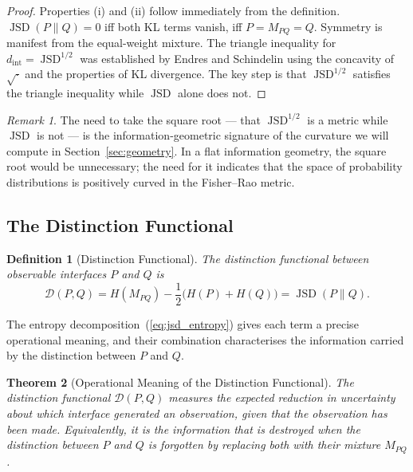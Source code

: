 \documentclass[12pt,a4paper]{article}
\newtheorem{theorem}{Theorem}[section]
\newtheorem{definition}[theorem]{Definition}
\theoremstyle{remark}
\newtheorem{remark}{Remark}[section]
\theoremstyle{definition}
\begin{document}
\begin{proof}
Properties (i) and (ii) follow immediately from the definition.
$\operatorname{JSD}(P\|Q) = 0$ iff both KL terms vanish, iff $P = M_{PQ} = Q$.
Symmetry is manifest from the equal-weight mixture. The triangle
inequality for $d_{\mathrm{int}} = \operatorname{JSD}^{1/2}$ was established
by Endres and Schindelin \cite{endres2003} using the concavity of
$\sqrt{\cdot}$ and the properties of KL divergence. The key step is that
$\operatorname{JSD}^{1/2}$ satisfies the triangle inequality while
$\operatorname{JSD}$ alone does not.
\end{proof}

\begin{remark}
The need to take the square root --- that $\operatorname{JSD}^{1/2}$ is
a metric while $\operatorname{JSD}$ is not --- is the information-geometric
signature of the curvature we will compute in Section~\ref{sec:geometry}.
In a flat information geometry, the square root would be unnecessary; the
need for it indicates that the space of probability distributions is
positively curved in the Fisher--Rao metric.
\end{remark}

\subsection{The Distinction Functional}

\begin{definition}[Distinction Functional]
\label{def:distinction}
The \emph{distinction functional} between observable interfaces $P$ and
$Q$ is
\begin{equation}
  \mathcal{D}(P,Q)
  = H(M_{PQ}) - \frac{1}{2}\bigl(H(P) + H(Q)\bigr)
  = \operatorname{JSD}(P \| Q).
\end{equation}
\end{definition}

The entropy decomposition~(\ref{eq:jsd_entropy}) gives each term a
precise operational meaning, and their combination characterises the
information carried by the distinction between $P$ and $Q$.

\begin{theorem}[Operational Meaning of the Distinction Functional]
\label{thm:distinction_meaning}
The distinction functional $\mathcal{D}(P,Q)$ measures the expected
reduction in uncertainty about which interface generated an observation,
given that the observation has been made. Equivalently, it is the
information that is destroyed when the distinction between $P$ and $Q$
is forgotten by replacing both with their mixture $M_{PQ}$.
\end{theorem}
\end{document}
